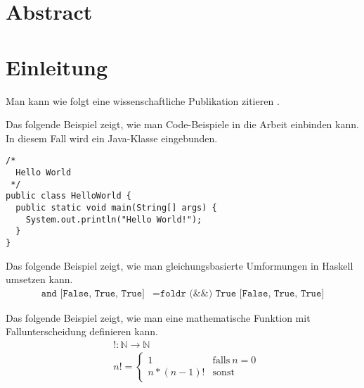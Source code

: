 \documentclass[a4paper, 10pt, DIV=13, BCOR=8mm]{scrbook}
\newcommand{\hs}[1]{\texttt{#1}}
\begin{document}
\chapter*{Abstract}

\blindtext



\tableofcontents


\chapter{Einleitung}

Man kann wie folgt eine wissenschaftliche Publikation zitieren \cite{christiansen2019verifying}.

\blindtext

Das folgende Beispiel zeigt, wie man Code-Beispiele in die Arbeit einbinden kann.
In diesem Fall wird ein Java-Klasse eingebunden.
\begin{verbatim}
/*
  Hello World
 */
public class HelloWorld {
  public static void main(String[] args) {
    System.out.println("Hello World!");
  }
}
\end{verbatim}

\blindtext

Das folgende Beispiel zeigt, wie man gleichungsbasierte Umformungen in Haskell umsetzen kann.
\begin{align*}
\hs{and [False, True, True]} &= \hs{foldr (&&) True [False, True, True]}
\end{align*}

\blindtext

Das folgende Beispiel zeigt, wie man eine mathematische Funktion mit Fallunterscheidung definieren kann.
\begin{align*}
& !\colon \mathbb{N} \to \mathbb{N}\\
& n! = \begin{cases}
  1 & \mbox{falls}~n = 0\\
  n * (n-1)! & \mbox{sonst}
\end{cases}
\end{align*}

\blindtext



\end{document}
